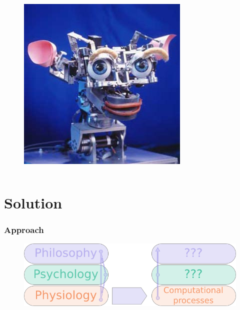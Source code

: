 \documentclass[12pt]{beamer}
\begin{document}
\begin{frame}
\begin{columns}[c]
\begin{figure}
\includegraphics[width=1.0\linewidth]{Kismet_312}
\end{figure}
\end{columns}
\end{frame}

\section{Solution}

\begin{frame}
\frametitle{Approach}
\begin{figure}
\includegraphics[width=1.0\linewidth]{layers_binding}
\end{figure}
\end{frame}
\end{document}

